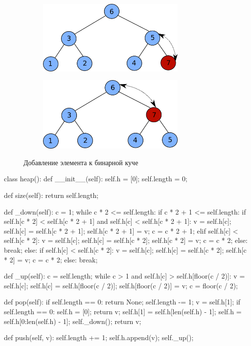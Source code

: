 \begin{figure}
\begin{subfigure}[t]{0.6\textwidth}
	\includegraphics[width=0.8\textwidth]{graphics/binary_heap_insert_1.png}
\end{subfigure}
\begin{subfigure}[t]{0.6\textwidth}
	\includegraphics[width=0.8\textwidth]{graphics/binary_heap_insert_2.png}
\end{subfigure}
\caption{Добавление элемента к бинарной куче}
\label{fig:binary_heap_insertion}
\end{figure}

\begin{python}
class heap():
	def __init__(self):
		self.h = [0];
		self.length = 0;

	def size(self):
		return self.length;

	def _down(self):
		c = 1;
		while c * 2 <= self.length:
			if c * 2 + 1 <= self.length:
				if self.h[c * 2] < self.h[c * 2 + 1] 
					and self.h[c] < self.h[c * 2 + 1]:
					v = self.h[c];
					self.h[c] = self.h[c * 2 + 1];
					self.h[c * 2 + 1] = v;
					c = c * 2 + 1;
				elif self.h[c] < self.h[c * 2]:
					v = self.h[c];
					self.h[c] = self.h[c * 2];
					self.h[c * 2] = v;
					c = c * 2;
				else:
					break;
			else:
				if self.h[c] < self.h[c * 2]:
					v = self.h[c];
					self.h[c] = self.h[c * 2];
					self.h[c * 2] = v;
					c = c * 2;
				else:
					break;

	def _up(self):
		c = self.length;
		while c > 1 and self.h[c] > self.h[floor(c / 2)]:
			v = self.h[c];
			self.h[c] = self.h[floor(c / 2)];
			self.h[floor(c / 2)] = v;
			c = floor(c / 2);

	def pop(self):
		if self.length == 0:
			return None;
		self.length -= 1;
		v = self.h[1];
		if self.length == 0:
			self.h = [0];
			return v;
		self.h[1] = self.h[len(self.h) - 1];
		self.h = self.h[0:len(self.h) - 1];
		self._down();
		return v;

	def push(self, v):
		self.length += 1;
		self.h.append(v);
		self._up();
\end{python}

